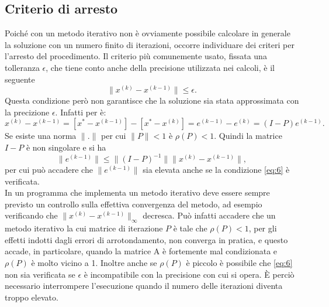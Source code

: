 \documentclass[12pt]{article}
\begin{document}
\subsection{Criterio di arresto}
Poiché con un metodo iterativo non è ovviamente possibile calcolare in generale la soluzione con un numero finito di iterazioni, occorre individuare dei criteri per l'arresto del procedimento. Il criterio più comunemente usato, fissata una tolleranza \(\epsilon\), che tiene conto anche della precisione utilizzata nei calcoli, è il seguente
\begin{equation}
    \label{eq:6}
    \|x^{(k)}-x^{(k-1)}\| \leq \epsilon.
\end{equation}
Questa condizione però non garantisce che la soluzione sia stata approssimata con la precizione \(\epsilon\). Infatti per è:
\begin{equation*}
    x^{(k)}-x^{(k-1)}=[x^*-x^{(k-1)}]-[x^*-x^{(k)}]=e^{(k-1)}-e^{(k)}=(I-P)e^{(k-1)}.
\end{equation*}
Se esiste una norma \(\|.\|\) per cui \(\|P\|<1\) è \(\rho(P)<1\). Quindi la matrice \(I-P\) è non singolare e si ha
\begin{equation*}
    \|e^{(k-1)}\| \leq \|(I-P)^{-1}\|\|x^{(k)}-x^{(k-1)}\|,
\end{equation*}
per cui può accadere che \(\|e^{(k-1)}\|\) sia elevata anche se la condizione \eqref{eq:6} è verificata.\\
In un programma che implementa un metodo iterativo deve essere sempre previsto un controllo sulla effettiva convergenza del metodo, ad esempio verificando che \(\|x^{(k)}-x^{(k-1)}\|_\infty\) decresca. Può infatti accadere che un metodo iterativo la cui matrice di iterazione \(P\) è tale che \(\rho(P)<1\), per gli effetti indotti dagli errori di arrotondamento, non converga in pratica, e questo accade, in particolare, quando la matrice A è fortemente mal condizionata e \(\rho(P)\) è molto vicino a 1. Inoltre anche se \(\rho(P)\) è piccolo è possibile che \eqref{eq:6} non sia verificata se \(\epsilon\) è incompatibile con la precisione con cui si opera. È perciò necessario interrompere l'esecuzione quando il numero delle iterazioni diventa troppo elevato.
\end{document}
